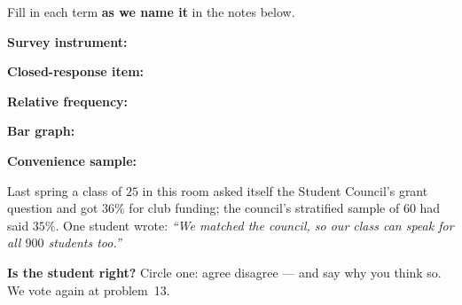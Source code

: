 \documentclass[12pt]{article}
\newcommand{\termrowheight}{1.85cm}
\newlength{\termrowinset}\setlength{\termrowinset}{7pt}
\newcommand{\vterm}[1]{%
  \par\noindent\begin{minipage}[t][\termrowheight][t]{\linewidth}%
    \vspace*{\termrowinset}%
    \textbf{\textcolor{cerulean}{#1:}}%
  \end{minipage}\par}
\begin{document}

\vspace{0.15in}

\begin{vocabbox}
\small
Fill in each term \textbf{as we name it} in the notes below.
\vterm{Survey instrument}
\vterm{Closed-response item}
\vterm{Relative frequency}
\vterm{Bar graph}
\vterm{Convenience sample}
\end{vocabbox}

\boxguard[12]
\begin{hookbox}
\small
Last spring a class of $25$ in this room asked itself the Student Council's grant question and
got $36\%$ for club funding; the council's stratified sample of $60$ had said $35\%$. One student
wrote: \emph{``We matched the council, so our class can speak for all $900$ students too.''}

\vspace{3pt}
\textbf{Is the student right?} Circle one: \quad agree \qquad disagree \quad --- and say why
you think so. We vote again at problem~13.
\par{}
\end{hookbox}
\end{document}
